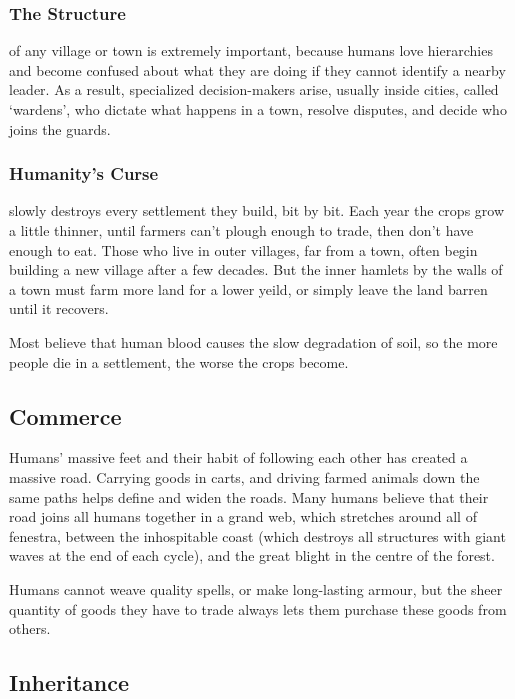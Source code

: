 \subsubsection{The Structure}
of any \gls{village} or town is extremely important, because humans love
hierarchies and become confused about what they are doing if they cannot
identify a nearby leader.  As a result, specialized decision-makers arise,
usually inside cities, called `\glspl{warden}', who dictate what happens in a
town, resolve disputes, and decide who joins the \glspl{guard}.

\subsubsection{Humanity's Curse}
slowly destroys every settlement they build, bit by bit.  Each year the crops grow a little thinner, until farmers can't plough enough to trade, then don't have enough to eat.
Those who live in outer \glspl{village}, far from a town, often begin building a new \gls{village} after a few decades.
But the inner hamlets by the walls of a town must farm more land for a lower yeild, or simply leave the land barren until it recovers.

Most believe that human blood causes the slow degradation of soil, so the more people die in a settlement, the worse the crops become.

\subsection{Commerce}

Humans' massive feet and their habit of following each other has created a massive road.
Carrying goods in carts, and driving farmed animals down the same paths helps define and widen the roads.
Many humans believe that their road joins all humans together in a grand web, which stretches around all of \gls{fenestra}, between the inhospitable coast (which destroys all structures with giant waves at the end of each \gls{cycle}), and the great \gls{blight} in the centre of the forest.

Humans cannot weave quality \glspl{spell}, or make long-lasting armour, but the sheer quantity of goods they have to trade always lets them purchase these goods from others.

\subsection{Inheritance}

